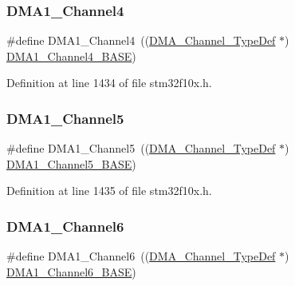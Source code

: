 \subsubsection{\texorpdfstring{D\+M\+A1\+\_\+\+Channel4}{DMA1\_Channel4}}
{\footnotesize\ttfamily \#define D\+M\+A1\+\_\+\+Channel4~((\hyperlink{struct_d_m_a___channel___type_def}{D\+M\+A\+\_\+\+Channel\+\_\+\+Type\+Def} $\ast$) \hyperlink{group___peripheral__memory__map_ga1adc93cd0baf0897202c71110e045692}{D\+M\+A1\+\_\+\+Channel4\+\_\+\+B\+A\+SE})}



Definition at line 1434 of file stm32f10x.\+h.

\mbox{\label{group___peripheral__declaration_ga06ff98ddef3c962795d2e2444004abff}} 
\subsubsection{\texorpdfstring{D\+M\+A1\+\_\+\+Channel5}{DMA1\_Channel5}}
{\footnotesize\ttfamily \#define D\+M\+A1\+\_\+\+Channel5~((\hyperlink{struct_d_m_a___channel___type_def}{D\+M\+A\+\_\+\+Channel\+\_\+\+Type\+Def} $\ast$) \hyperlink{group___peripheral__memory__map_gac041a71cd6c1973964f847a68aa14478}{D\+M\+A1\+\_\+\+Channel5\+\_\+\+B\+A\+SE})}



Definition at line 1435 of file stm32f10x.\+h.

\mbox{\label{group___peripheral__declaration_gac013c4376e4797831b5ddd2a09519df8}} 
\subsubsection{\texorpdfstring{D\+M\+A1\+\_\+\+Channel6}{DMA1\_Channel6}}
{\footnotesize\ttfamily \#define D\+M\+A1\+\_\+\+Channel6~((\hyperlink{struct_d_m_a___channel___type_def}{D\+M\+A\+\_\+\+Channel\+\_\+\+Type\+Def} $\ast$) \hyperlink{group___peripheral__memory__map_ga896c2c7585dd8bc3969cf8561f689d2d}{D\+M\+A1\+\_\+\+Channel6\+\_\+\+B\+A\+SE})}




